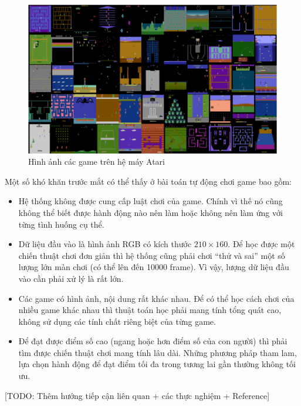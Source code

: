 \begin{figure}
	\centering
	\includegraphics[width=\textwidth]{ale_55_games}
	\caption{Hình ảnh các game trên hệ máy Atari}
	\label{Ale55Games}
\end{figure}

Một số khó khăn trước mắt có thể thấy ở bài toán tự động chơi game bao gồm:
\begin{itemize}
	\item Hệ thống không được cung cấp luật chơi của game. 
	Chính vì thế nó cũng không thể biết được hành động nào nên làm hoặc không nên làm ứng với từng tình huống cụ thể.
	\item Dữ liệu đầu vào là hình ảnh RGB có kích thước $210\times160$. 
	Để học được một chiến thuật chơi đơn giản thì hệ thống cũng phải chơi ``thử và sai'' một số lượng lớn màn chơi (có thể lên đến 10000 frame). 
	Vì vậy, lượng dữ liệu đầu vào cần phải xử lý là rất lớn.
	\item Các game có hình ảnh, nội dung rất khác nhau. 
	Để có thể học cách chơi của nhiều game khác nhau thì thuật toán học phải mang tính tổng quát cao, không sử dụng các tính chất riêng biệt của từng game.
	\item Để đạt được điểm số cao (ngang hoặc hơn điểm số của con người) thì phải tìm được chiến thuật chơi mang tính lâu dài. 
	Những phương pháp tham lam, lựa chọn hành động để đạt điểm tối đa trong tương lai gần thường không tối ưu.
\end{itemize}

[TODO: Thêm hướng tiếp cận liên quan + các thực nghiệm + Reference]



